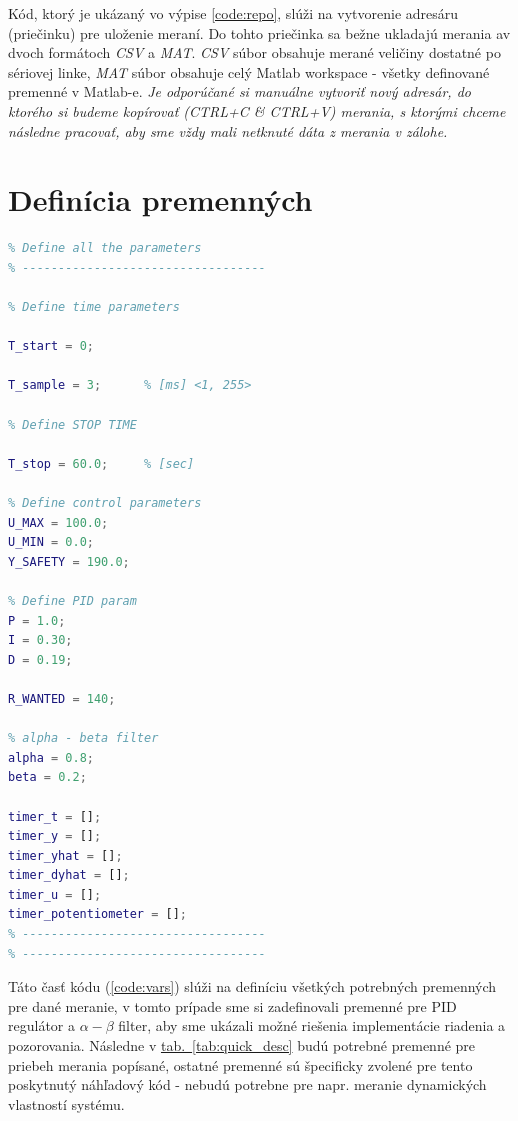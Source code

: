 \documentclass[a4paper, 10pt, ]{article}
\newcommand{\tabref}[1]{\hyperref[#1]{tab.~\ref*{#1}}}
\begin{document}
Kód, ktorý je ukázaný vo výpise \ref{code:repo}, slúži na vytvorenie adresáru (priečinku) pre uloženie meraní. Do tohto priečinka sa bežne ukladajú merania av dvoch formátoch \emph{CSV} a \emph{MAT}. \emph{CSV} súbor obsahuje merané veličiny dostatné po sériovej linke, \emph{MAT} súbor obsahuje celý Matlab workspace - všetky definované premenné v Matlab-e.
\emph{Je odporúčané si manuálne vytvoriť nový adresár, do ktorého si budeme kopírovať (CTRL+C & CTRL+V) merania, s ktorými chceme následne pracovať, aby sme vždy mali netknuté dáta z merania v zálohe.}

\section{Definícia premenných}
\begin{lstlisting}[caption=Definícia všetkých potrebných premenných., label={code:vars}, language=Matlab]
% ----------------------------------
% Define all the parameters
% ----------------------------------

% Define time parameters

T_start = 0;

T_sample = 3;      % [ms] <1, 255>

% Define STOP TIME

T_stop = 60.0;     % [sec]

% Define control parameters
U_MAX = 100.0;
U_MIN = 0.0;
Y_SAFETY = 190.0;

% Define PID param
P = 1.0;
I = 0.30;
D = 0.19;

R_WANTED = 140;

% alpha - beta filter
alpha = 0.8;
beta = 0.2;

timer_t = [];
timer_y = [];
timer_yhat = [];
timer_dyhat = [];
timer_u = [];
timer_potentiometer = [];
% ----------------------------------
% ----------------------------------
\end{lstlisting}

Táto časť kódu (\ref{code:vars}) slúži na definíciu všetkých potrebných premenných pre dané meranie, v tomto prípade sme si zadefinovali premenné pre PID regulátor a $\alpha-\beta$ filter, aby sme ukázali možné riešenia implementácie riadenia a pozorovania. Následne v \tabref{tab:quick_desc} budú potrebné premenné pre priebeh merania popísané, ostatné premenné sú špecificky zvolené pre tento poskytnutý náhľadový kód - nebudú potrebne pre napr. meranie dynamických vlastností systému.
\end{document}
